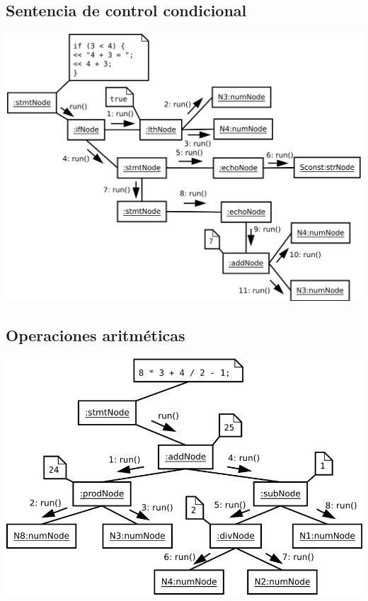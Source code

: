 \subsection {Sentencia de control condicional }
\begin{center}
\includegraphics[scale=0.38]{if.png} \\
\end{center}

\subsection {Operaciones aritméticas }
\begin{center}
\includegraphics[scale=0.38]{arith.png} \\
\end{center}

